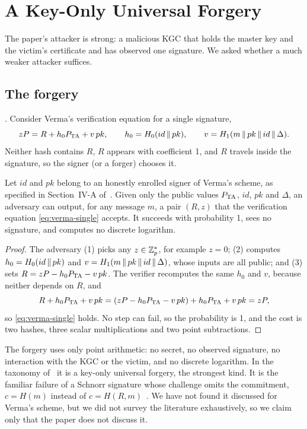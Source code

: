 \section{A Key-Only Universal Forgery}\label{sec:keyonly}

The paper's attacker is strong: a malicious KGC that holds the master key and the victim's certificate and
has observed one signature. We asked whether a much weaker attacker suffices.

\subsection{The forgery}
. Consider Verma's verification equation for a single signature,
\begin{equation}\label{eq:verma-single}
zP=R+h_0P_{\mathrm{TA}}+v\,pk,\qquad h_0=H_0(id\,\|\, pk),\qquad v=H_1(m\,\|\, pk\,\|\, id\,\|\,\Delta).
\end{equation}
Neither hash contains $R$, $R$ appears with coefficient 1, and $R$ travels inside the signature, so the
signer (or a forger) chooses it.

\begin{proposition}\label{prop:keyonly}
Let $id$ and $pk$ belong to an honestly enrolled signer of Verma's scheme, as specified in Section~IV-A
of~\cite{qiao2023}. Given only the public values $P_{\mathrm{TA}}$, $id$, $pk$ and $\Delta$, an adversary can output,
for any message $m$, a pair $(R,z)$ that the verification equation \eqref{eq:verma-single} accepts. It
succeeds with probability 1, sees no signature, and computes no discrete logarithm.
\end{proposition}

\begin{proof}
The adversary (1) picks any $z\in\mathbb{Z}_p^{*}$, for example $z=0$; (2) computes $h_0=H_0(id\,\|\, pk)$ and
$v=H_1(m\,\|\, pk\,\|\, id\,\|\,\Delta)$, whose inputs are all public; and (3) sets
$R=zP-h_0P_{\mathrm{TA}}-v\,pk$. The verifier recomputes the same $h_0$ and $v$, because neither depends on $R$, and
\[
R+h_0P_{\mathrm{TA}}+v\,pk=(zP-h_0P_{\mathrm{TA}}-v\,pk)+h_0P_{\mathrm{TA}}+v\,pk=zP,
\]
so \eqref{eq:verma-single} holds. No step can fail, so the probability is 1, and the cost is two hashes,
three scalar multiplications and two point subtractions.
\end{proof}

The forgery uses only point arithmetic: no
secret, no observed signature, no interaction with the KGC or the victim, and no discrete logarithm. In
the taxonomy of~\cite{gmr1988} it is a key-only universal forgery, the strongest kind. It is the familiar
failure of a Schnorr signature whose challenge omits the commitment, $c=H(m)$ instead of
$c=H(R,m)$~\cite{schnorr1991}. We have not found it discussed for Verma's scheme, but we did not survey
the literature exhaustively, so we claim only that the paper does not discuss it.

